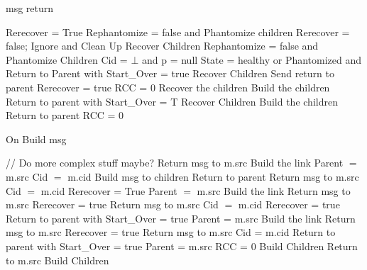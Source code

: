 \documentclass{article}
\begin{document}
\begin{algorithm}
\caption{msg return}
\label{ build or recoveryDone message received}
\begin{algorithmic}[1]
				\State Rerecover = True
			\EndIf
				\State Rephantomize = false and Phantomize children
				\State Rerecover = false;
					\State Ignore and Clean Up
				\Else
					\State Recover Children
				\EndIf
			\EndIf
		\Else
				\State Rephantomize = false and Phantomize Children
				\State Cid = $\bot$ and p = null
				\State State = healthy or Phantomized and  Return to Parent with Start\_Over = true
				\State Recover Children
			\Else
				\State Send return to parent
			\EndIf
		\EndIf
				\State Rerecover = true
			\EndIf
					\State RCC = 0
					\State Recover the children
				\Else
					\State Build the children
				\EndIf
			\EndIf
		\Else
				\State Return to parent with Start\_Over = T
					\State Recover Children
				\Else
					\State Build the children
				\EndIf
			\Else
				\State Return to parent
				\State RCC = 0
			\EndIf
		\EndIf
	\EndIf
\EndIf
\EndProcedure
\end{algorithmic}
\end{algorithm}	


	
\begin{algorithm}
\caption{On Build msg}
\label{Build message received}
\begin{algorithmic}[1]
  // Do more complex stuff maybe?
	\State Return msg to m.src
	\State Build the link
	\State Parent $=$ m.src
	\State Cid $=$ m.cid
		\State Build msg to children
	\Else
		\State Return to parent
	\EndIf
{}
	\State Return msg to m.src
			\State Cid $=$ m.cid
			\State Rerecover = True
			\State Parent $=$ m.src
			\State Build the link
			\State Return msg to m.src
		\Else
			\State Rerecover = true
			\State Return msg to m.src
		\EndIf
	\Else
			\State Cid $=$ m.cid
			\State Rerecover = true
			\State Return to parent with Start\_Over = true
			\State Parent = m.src
			\State Build the link
			\State Return msg to m.src
		\Else
			\State Rerecover = true
			\State Return msg to m.src
		\EndIf
	\EndIf
{}
		\State Cid = m.cid
		\State Return to parent with Start\_Over = true
		\State Parent = m.src
		\State RCC = 0
		\State Build Children
	\Else
		\State Return to m.src
		\State Build Children
	\EndIf
\EndIf
\EndProcedure
\end{algorithmic}
\end{algorithm}	
\end{document}
